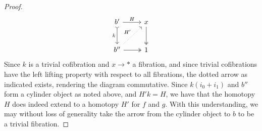 \begin{proof}
	\[\begin{tikzcd}[row sep = 2.5em, column sep = 2.5em]
	b'\ar[" k "', tail, d] \ar[" H ", r]  & x \ar[two heads, d]  \\
	b'' \ar[two heads, r] \ar[" H' ", dotted, ur]  & 1
	\end{tikzcd}\]
	Since $k$ is a trivial cofibration and $x\to *$ a fibration, and since trivial cofibrations have the left lifting property with respect to all fibrations, the dotted arrow as indicated exists, rendering the diagram commutative. Since $k(i_0+i_1)$ and $b''$ form a cylinder object as noted above, and $H'k=H$, we have that the homotopy $H$ does indeed extend to a homotopy $H'$ for $f$ and $g$. With this understanding, we may without loss of generality take the arrow from the cylinder object to $b$ to be a trivial fibration.
	

\end{proof}
